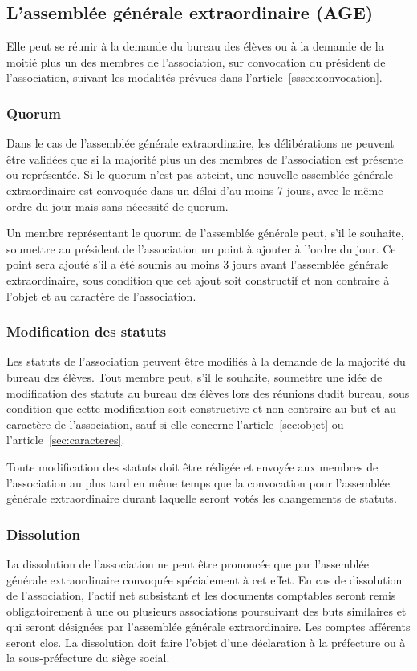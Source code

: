 \documentclass{article}
\begin{document}
		\subsection{L’assemblée générale extraordinaire (AGE)}
			Elle peut se réunir à la demande du bureau des élèves ou à la
			demande de la moitié plus un des membres de l’association, sur
			convocation du président de l’association, suivant les modalités
			prévues dans l’article~\ref{sssec:convocation}.

			\subsubsection{Quorum}
				Dans le cas de l’assemblée générale extraordinaire, les
				délibérations ne peuvent être validées que si la majorité plus
				un des membres de l’association est présente ou représentée. Si
				le quorum n’est pas atteint, une nouvelle assemblée générale
				extraordinaire est convoquée dans un délai d’au moins 7 jours,
				avec le même ordre du jour mais sans nécessité de quorum.

				Un membre représentant le quorum de l’assemblée générale peut,
				s’il le souhaite, soumettre au président de l’association un
				point à ajouter à l’ordre du jour. Ce point sera ajouté s’il a
				été soumis au moins 3 jours avant l’assemblée générale
				extraordinaire, sous condition que cet ajout soit constructif et
				non contraire à l'objet et au caractère de l’association.

			\subsubsection{Modification des statuts}
				Les statuts de l’association peuvent être modifiés à la demande
				de la majorité du bureau des élèves. Tout membre peut, s’il le
				souhaite, soumettre une idée de modification des statuts au
				bureau des élèves lors des réunions dudit bureau, sous condition
				que cette modification soit constructive et non contraire au but
				et au caractère de l’association, sauf si elle concerne
				l'article~\ref{sec:objet} ou l'article~\ref{sec:caracteres}.

				Toute modification des statuts doit être rédigée et envoyée aux
				membres de l’association au plus tard en même temps que la
				convocation pour l’assemblée générale extraordinaire durant
				laquelle seront votés les changements de statuts.

			\subsubsection{Dissolution}
				La dissolution de l’association ne peut être prononcée que par
				l’assemblée générale extraordinaire convoquée spécialement à cet
				effet. En cas de dissolution de l’association, l’actif net
				subsistant et les documents comptables seront remis
				obligatoirement à une ou plusieurs associations poursuivant des
				buts similaires et qui seront désignées par l’assemblée générale
				extraordinaire. Les comptes afférents seront clos. La
				dissolution doit faire l’objet d’une déclaration à la préfecture
				ou à la sous-préfecture du siège social.
\end{document}
